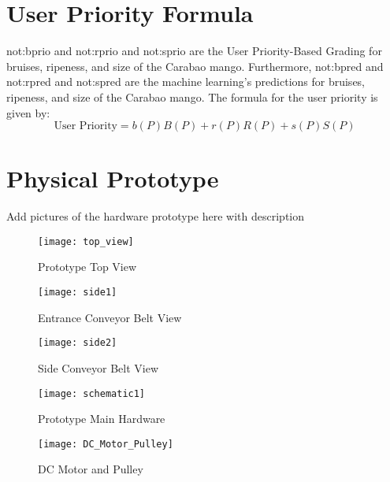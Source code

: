 \section{User Priority Formula} \label{sec:userPriorityFormula}
\gls{not:bprio} and \gls{not:rprio} and \gls{not:sprio} are the \gls{User Priority-Based Grading} for bruises, ripeness, and size of the Carabao mango. 
Furthermore, \gls{not:bpred} and \gls{not:rpred} and \gls{not:spred} are the machine learning's predictions for bruises, ripeness, and size of the Carabao mango.
The formula for the user priority is given by:
\begin{equation}
	\label{eq:userPriority}
	\text{User Priority} = \ensuremath{b \left( P \right)  B\left( P \right) + r \left( P \right) R\left( P \right) + s \left( P \right) S\left( P \right)}
\end{equation}


\section{Physical Prototype} \label{sec:physicalPrototype}

Add pictures of the hardware prototype here with description

\begin{figure}[!htbp]
	\centering
	\texttt{[image: top\_view]}
	\caption{Prototype Top View}
	\label{fig:top_view_fig}
\end{figure}

\begin{figure}[!htbp]
	\centering
	\texttt{[image: side1]}
	\caption{Entrance Conveyor Belt View}
	\label{fig:side1_fig}
\end{figure}

\begin{figure}[!htbp]
	\centering
	\texttt{[image: side2]}
	\caption{Side Conveyor Belt View}
	\label{fig:side2_fig}
\end{figure}

\begin{figure}[!htbp]
	\centering
	\texttt{[image: schematic1]}
	\caption{Prototype Main Hardware}
	\label{fig:main_hardware_fig}
\end{figure}

\begin{figure}[!htbp]
	\centering
	\texttt{[image: DC\_Motor\_Pulley]}
	\caption{DC Motor and Pulley}
	\label{fig:dc_motor_pulley_fig}
\end{figure}


